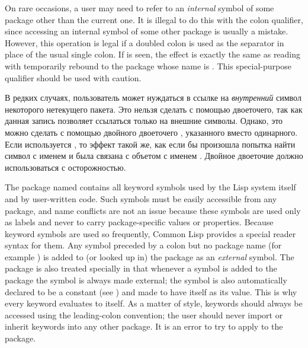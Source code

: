 On rare occasions, a user may need to refer to an \emph{internal} symbol of
some package other than the current one.  It is illegal to do this with
the colon qualifier, since accessing an internal symbol of some other
package is usually a mistake.  However, this operation is legal if
a doubled colon
\cd{::} is used as the separator in place of the usual single colon.  If
 is seen, the effect is exactly the same as
reading  with  temporarily rebound to the
package whose name is .  This special-purpose qualifier
should be used with caution.

В редких случаях, пользователь может нуждаться в ссылке на \emph{внутренний}
символ некоторого нетекущего пакета. Это нельзя сделать с помощью двоеточего,
так как данная запись позволяет ссылаться только на внешние символы. Однако, это
можно сделать с помощью двойного двоеточего \cd{::}, указанного вместо
одинарного. Если используется , то эффект такой же, как если
бы произошла попытка найти символ с именем  и  была
связана с объетом с именем . Двойное двоеточие должно использоваться
с осторожностью.

The package named  contains all keyword symbols used by the
Lisp system itself and by user-written code.  Such symbols must be
easily accessible from any package, and name conflicts are not an issue
because these symbols are used only as labels and never to carry
package-specific values or properties.  Because keyword symbols are used
so frequently, Common Lisp provides a special reader syntax for them.
Any symbol preceded by a colon but no package name (for example
) is added to (or looked up in) the  package as
an \emph{external} symbol.  The  package is also treated
specially in that whenever a symbol is added to the  package
the symbol is always made external; the symbol
is also automatically declared to be a constant
(see ) and made to
have itself as its value.  This is why every keyword evaluates to
itself.  As a matter of style, keywords should always be accessed using
the leading-colon convention; the user should never import or inherit
keywords into any other package.  It is an error to try to apply
 to the  package.

